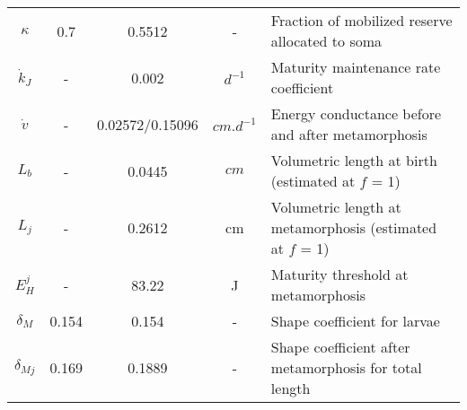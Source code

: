 \documentclass[10pt,a4paper]{article}
\begin{document}
\begin{landscape}
\begin{table}[]
\begin{tabular}{c|c|c|c|l}
$\kappa$ & 0.7 & 0.5512 & - & Fraction of mobilized reserve allocated to soma\\
$\dot{k}_{J}$ & - & 0.002 	        & $d^{-1}$     & Maturity maintenance rate coefficient\\
$\dot{v}$    & - & 0.02572/0.15096 & $cm. d^{-1}$ & Energy conductance before and after metamorphosis\\
$L_{b}$      & - & 0.0445          & $cm$         & Volumetric length at birth (estimated at $f$ = 1)\\
$L_{j}$      & - & 0.2612          & cm & Volumetric length at metamorphosis (estimated at $f$ = 1) \\
$E_{H}^{j}$  & - & 83.22           & J  & Maturity threshold at metamorphosis\\
$\delta_{M}$ & 0.154 & 0.154 & - & Shape coefficient for larvae\\
$\delta_{Mj}$& 0.169 & 0.1889& - & Shape coefficient after metamorphosis for total length\\
\end{tabular}
\end{table}
\end{landscape}
\end{document}
